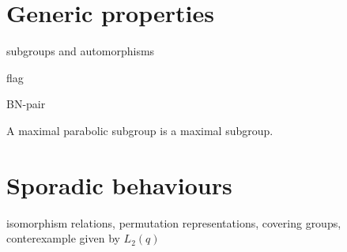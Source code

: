 \documentclass[a4paper,11pt]{article}
\def\subtitle#1{\section{#1}}
\begin{document}
\subtitle{Generic properties}

subgroups and automorphisms

\begin{definition}
    flag
\end{definition}

BN-pair

\begin{proposition}
    A maximal parabolic subgroup is a maximal subgroup.
\end{proposition}


\subtitle{Sporadic behaviours}

isomorphism relations, permutation representations, covering groups, conterexample given by $L_2(q)$




\ifx\ChapThreeSecThree\undefined %
     
\end{document}
